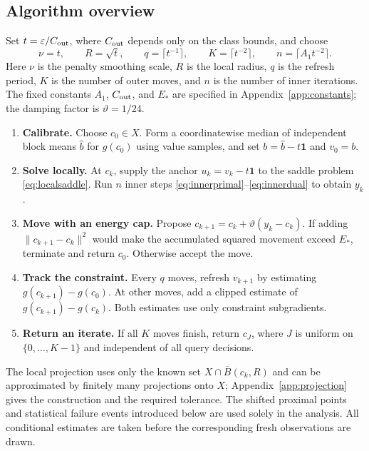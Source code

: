 \documentclass[11pt,a4paper]{article}
\newcommand{\eps}{\varepsilon}
\theoremstyle{remark}
\numberwithin{equation}{section}
\begin{document}
\subsection{Algorithm overview}
Set $t=\eps/C_{\rm out}$, where $C_{\rm out}$ depends only on the class bounds, and choose
\[
 \nu=t,\qquad R=\sqrt t,\qquad
 q=\lceil t^{-1}\rceil,\qquad K=\lceil t^{-2}\rceil,\qquad
 n=\lceil A_1t^{-2}\rceil.
\]
Here $\nu$ is the penalty smoothing scale, $R$ is the local radius, $q$ is the refresh period, $K$ is the number of outer moves, and $n$ is the number of inner iterations. The fixed constants $A_1$, $C_{\rm out}$, and $E_*$ are specified in Appendix~\ref{app:constants}; the damping factor is $\vartheta=1/24$.

\begin{enumerate}
\item \textbf{Calibrate.} Choose $c_0\in X$. Form a coordinatewise median of independent block means $\widehat b$ for $g(c_0)$ using value samples, and set $b=\widehat b-t\mathbf1$ and $v_0=b$.
\item \textbf{Solve locally.} At $c_k$, supply the anchor $u_k=v_k-t\mathbf1$ to the saddle problem \eqref{eq:localsaddle}. Run $n$ inner steps \eqref{eq:innerprimal}--\eqref{eq:innerdual} to obtain $y_k$.
\item \textbf{Move with an energy cap.} Propose $c_{k+1}=c_k+\vartheta(y_k-c_k)$. If adding $\|c_{k+1}-c_k\|^2$ would make the accumulated squared movement exceed $E_*$, terminate and return $c_0$. Otherwise accept the move.
\item \textbf{Track the constraint.} Every $q$ moves, refresh $v_{k+1}$ by estimating $g(c_{k+1})-g(c_0)$. At other moves, add a clipped estimate of $g(c_{k+1})-g(c_k)$. Both estimates use only constraint subgradients.
\item \textbf{Return an iterate.} If all $K$ moves finish, return $c_J$, where $J$ is uniform on $\{0,\ldots,K-1\}$ and independent of all query decisions.
\end{enumerate}

The local projection uses only the known set $X\cap\overline B(c_k,R)$ and can be approximated by finitely many projections onto $X$; Appendix~\ref{app:projection} gives the construction and the required tolerance. The shifted proximal points and statistical failure events introduced below are used solely in the analysis. All conditional estimates are taken before the corresponding fresh observations are drawn.
\end{document}
